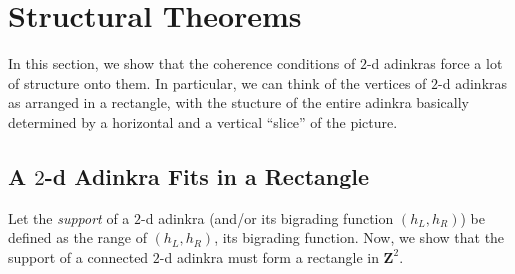 \documentclass[12pt,twoside,singlespace]{article}
\numberwithin{equation}{section}
\theoremstyle{definition}
\newcommand{\ZZ}{\mathbf{Z}}
\begin{document}
\section{Structural Theorems}

In this section, we show that the coherence conditions of $2$-d adinkras force a lot of structure onto them. In particular, we can think of the vertices of $2$-d adinkras as arranged in a rectangle, with the stucture of the entire adinkra basically determined by a horizontal and a vertical ``slice'' of the picture.

\subsection{A $2$-d Adinkra Fits in a Rectangle}

Let the \emph{support} of a $2$-d adinkra (and/or its bigrading function $(h_L,h_R)$) be defined as the range of $(h_L,h_R)$, its bigrading function. Now, we show that the support of a connected $2$-d adinkra must form a rectangle in $\ZZ^2$.




\end{document}
